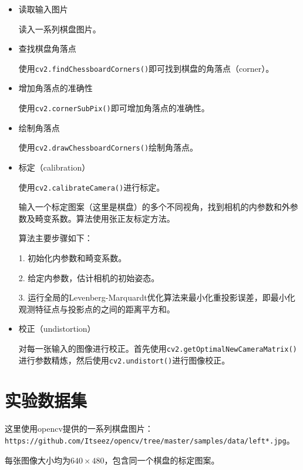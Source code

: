 \documentclass[a4paper, 12pt, UTF8]{article}
\begin{document}
\begin{itemize}

\item 读取输入图片

读入一系列棋盘图片。

\item 查找棋盘角落点

使用\lstinline[language=Python]{cv2.findChessboardCorners()}即可找到棋盘的角落点（corner）。

\item 增加角落点的准确性

使用\lstinline[language=Python]{cv2.cornerSubPix()}即可增加角落点的准确性。

\item 绘制角落点

使用\lstinline[language=Python]{cv2.drawChessboardCorners()}绘制角落点。

\item 标定（calibration）

使用\lstinline[language=Python]{cv2.calibrateCamera()}进行标定。

输入一个标定图案（这里是棋盘）的多个不同视角，找到相机的内参数和外参数及畸变系数。算法使用张正友标定方法。

算法主要步骤如下：

1. 初始化内参数和畸变系数。

2. 给定内参数，估计相机的初始姿态。

3. 运行全局的Levenberg-Marquardt优化算法来最小化重投影误差，即最小化观测特征点与投影点的之间的距离平方和。

\item 校正（undistortion）

对每一张输入的图像进行校正。首先使用\lstinline[language=Python]{cv2.getOptimalNewCameraMatrix()}进行参数精炼，然后使用\lstinline[language=Python]{cv2.undistort()}进行图像校正。

\end{itemize}


\section{实验数据集}

这里使用opencv提供的一系列棋盘图片：\lstinline{https://github.com/Itseez/opencv/tree/master/samples/data/left*.jpg}。

每张图像大小均为$640 \times 480$，包含同一个棋盘的标定图案。

\end{document}
